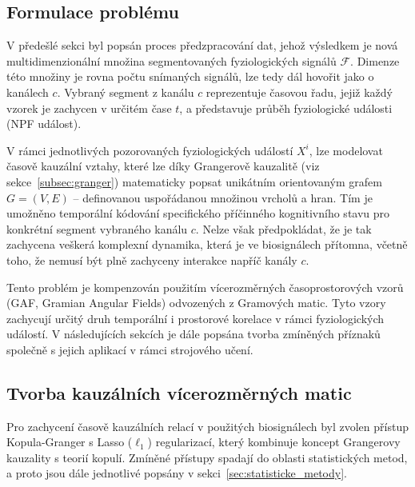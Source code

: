 \subsection{Formulace problému}
\label{subsec:definice_problemu}
V předešlé sekci byl popsán proces předzpracování dat, jehož výsledkem je nová
multidimenzionální množina segmentovaných fyziologických signálů $\mathcal{F}$.
Dimenze této množiny je rovna počtu snímaných signálů, lze tedy dál hovořit jako
o kanálech $c$. Vybraný segment z kanálu $c$ reprezentuje časovou řadu, jejiž
každý vzorek je zachycen v určitém čase $t$, a představuje průběh fyziologické
události (\gls{NPF} událost).

V rámci jednotlivých pozorovaných fyziologických událostí $X^i$, lze modelovat
časově kauzální vztahy, které lze díky Grangerově kauzalitě (viz
sekce~\ref{subsec:granger}) matematicky popsat unikátním orientovaným grafem
$G=(V,E)$ -- definovanou uspořádanou množinou vrcholů a hran. Tím je umožněno
temporální kódování specifického příčinného kognitivního stavu pro konkrétní
segment vybraného kanálu $c$. Nelze však předpokládat, že je tak zachycena
veškerá komplexní dynamika, která je ve biosignálech přítomna, včetně toho, že
nemusí být plně zachyceny interakce napříč kanály $c$.

Tento problém je kompenzován použitím vícerozměrných časoprostorových vzorů
(\gls{GAF}, Gramian Angular Fields) odvozených z Gramových matic. Tyto vzory
zachycují určitý druh temporální i prostorové korelace v rámci fyziologických
událostí. V následujících sekcích je dále popsána tvorba zmíněných příznaků
společně s jejich aplikací v rámci strojového učení.

\subsection{Tvorba kauzálních vícerozměrných matic}
\label{subsec:kauzalni_matice}
Pro zachycení časově kauzálních relací v použitých biosignálech byl zvolen
přístup Kopula-Granger s Lasso ($\ell_1$) regularizací, který kombinuje koncept
Grangerovy kauzality s teorií kopulí. Zmíněné přístupy spadají do oblasti
statistických metod, a proto jsou dále jednotlivé popsány v
sekci~\ref{sec:statisticke_metody}.

